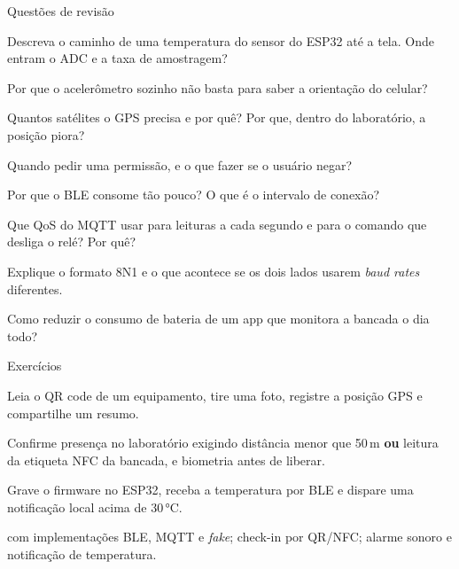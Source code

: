 \documentclass[aspectratio=169,10pt]{beamer}
\begin{document}
\begin{frame}{Questões de revisão}
  \begin{questoes}
    \item Descreva o caminho de uma temperatura do sensor do ESP32 até a tela. Onde entram o ADC e a taxa de amostragem?
    \item Por que o acelerômetro sozinho não basta para saber a orientação do celular?
    \item Quantos satélites o GPS precisa e por quê? Por que, dentro do laboratório, a posição piora?
    \item Quando pedir uma permissão, e o que fazer se o usuário negar?
    \item Por que o BLE consome tão pouco? O que é o intervalo de conexão?
    \item Que QoS do MQTT usar para leituras a cada segundo e para o comando que desliga o relé? Por quê?
    \item Explique o formato 8N1 e o que acontece se os dois lados usarem \emph{baud rates} diferentes.
    \item Como reduzir o consumo de bateria de um app que monitora a bancada o dia todo?
  \end{questoes}
\end{frame}

\begin{frame}{Exercícios}
  \begin{exercicio}
    Leia o QR code de um equipamento, tire uma foto, registre a posição GPS e compartilhe um resumo.
  \end{exercicio}
  \begin{exercicio}
    Confirme presença no laboratório exigindo distância menor que 50\,m \textbf{ou} leitura da etiqueta NFC da bancada, e biometria antes de liberar.
  \end{exercicio}
  \begin{exercicio}
    Grave o firmware no ESP32, receba a temperatura por BLE e dispare uma notificação local acima de 30\,°C.
  \end{exercicio}
  \begin{projeto}
     com implementações BLE, MQTT e \emph{fake}; check-in por QR/NFC; alarme sonoro e notificação de temperatura.
  \end{projeto}
\end{frame}
\end{document}
